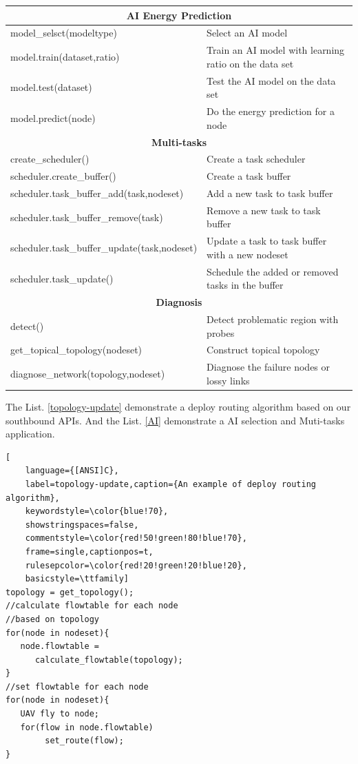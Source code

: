 \begin{table}[htbp]
{\begin{tabular}{|l|l|}
		\hline
		\multicolumn{2}{|c|}{\textbf{AI Energy Prediction}}\\
		\hline
		model\_selsct(modeltype) & Select an AI model\\
		\hline
		model.train(dataset,ratio) & Train an AI model with learning ratio on the data set\\
		\hline
		model.test(dataset) & Test the AI model on the data set\\
		\hline
		model.predict(node) & Do the energy prediction for a node \\
		\hline
		\multicolumn{2}{|c|}{\textbf{Multi-tasks}}\\
		\hline
		create\_scheduler() & Create a task scheduler \\
		\hline
		scheduler.create\_buffer() & Create a task buffer \\
		\hline
		scheduler.task\_buffer\_add(task,nodeset) & Add a new task to task buffer \\
		\hline
		scheduler.task\_buffer\_remove(task) & Remove a new task to task buffer \\
		\hline
		scheduler.task\_buffer\_update(task,nodeset) & Update a task to task buffer with a new nodeset \\
		\hline
		scheduler.task\_update() & Schedule the added or removed tasks in the buffer\\
		\hline
		\multicolumn{2}{|c|}{\textbf{Diagnosis}}\\
		\hline
		detect() & Detect problematic region with probes \\
		\hline
		get\_topical\_topology(nodeset) & Construct topical topology\\
		\hline
		diagnose\_network(topology,nodeset) & Diagnose the failure nodes or lossy links\\
		\hline
	\end{tabular}
	}
\end{table}

The List. \ref{topology-update} demonstrate a deploy routing algorithm based on our southbound APIs. 
And the List. \ref{AI} demonstrate a AI selection and Muti-tasks application.

\begin{lstlisting}[
	language={[ANSI]C},
	label=topology-update,caption={An example of deploy routing algorithm},
	keywordstyle=\color{blue!70},
	showstringspaces=false,
	commentstyle=\color{red!50!green!80!blue!70},
	frame=single,captionpos=t,
	rulesepcolor=\color{red!20!green!20!blue!20},
	basicstyle=\ttfamily]
topology = get_topology();
//calculate flowtable for each node
//based on topology
for(node in nodeset){
   node.flowtable =
      calculate_flowtable(topology);
}
//set flowtable for each node
for(node in nodeset){
   UAV fly to node;
   for(flow in node.flowtable)
        set_route(flow);
}

\end{lstlisting}

